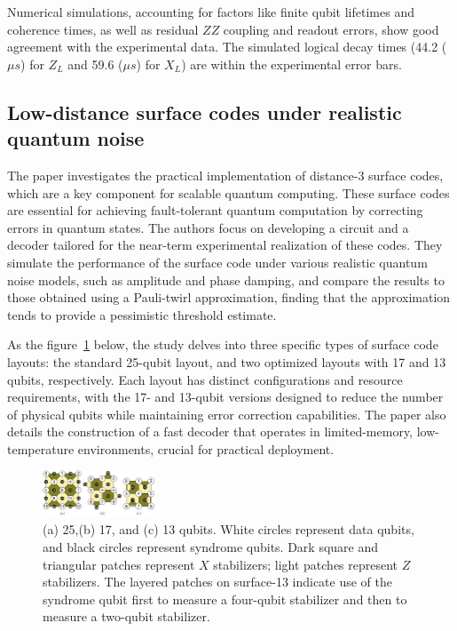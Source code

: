 Numerical simulations, accounting for factors like finite qubit lifetimes and coherence times, as well as residual $ZZ$ coupling and readout errors, show good agreement with the experimental data. The simulated logical decay times (44.2 ($\mu s$) for $Z_L$ and 59.6 ($\mu s$) for $X_L$) are within the experimental error bars.

\subsection{Low-distance surface codes under realistic quantum noise}

The paper investigates the practical implementation of distance-3 surface codes, which are a key component for scalable quantum computing. These surface codes are essential for achieving fault-tolerant quantum computation by correcting errors in quantum states. The authors focus on developing a circuit and a decoder tailored for the near-term experimental realization of these codes. They simulate the performance of the surface code under various realistic quantum noise models, such as amplitude and phase damping, and compare the results to those obtained using a Pauli-twirl approximation, finding that the approximation tends to provide a pessimistic threshold estimate.

As the figure~\ref{fig:25_qubits} below, the study delves into three specific types of surface code layouts: the standard 25-qubit layout, and two optimized layouts with 17 and 13 qubits, respectively. Each layout has distinct configurations and resource requirements, with the 17- and 13-qubit versions designed to reduce the number of physical qubits while maintaining error correction capabilities. The paper also details the construction of a fast decoder that operates in limited-memory, low-temperature environments, crucial for practical deployment.
\begin{figure}[h]
    \centering
    \includegraphics[width=0.3\textwidth]{sections/5_practical_implementation/25_qubits.jpg}
    \caption{(a) 25,(b) 17, and (c) 13 qubits. White circles represent data qubits, and black circles represent syndrome qubits. Dark square and triangular patches represent $X$ stabilizers; light patches represent $Z$ stabilizers. The layered patches on surface-13 indicate use of the syndrome qubit first to measure a four-qubit stabilizer and then to measure a two-qubit stabilizer.}
    \label{fig:25_qubits}
\end{figure}

